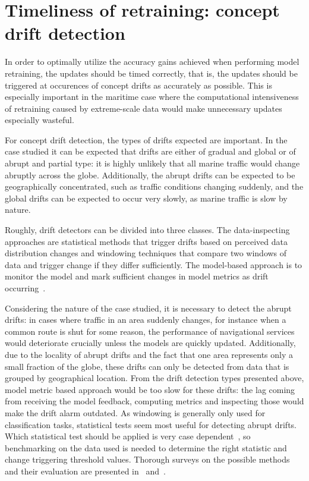 \section{Timeliness of retraining: concept drift detection}

In order to optimally utilize the accuracy gains achieved when performing model retraining, the updates should be timed correctly, that is, the updates should be triggered at occurences of concept drifts as accurately as possible. This is especially important in the maritime case where the computational intensiveness of retraining caused by extreme-scale data would make unnecessary updates especially wasteful.

For concept drift detection, the types of drifts expected are important. In the case studied it can be expected that drifts are either of gradual and global or of abrupt and partial type: it is highly unlikely that all marine traffic would change abruptly across the globe. Additionally, the abrupt drifts can be expected to be geographically concentrated, such as traffic conditions changing suddenly, and the global drifts can be expected to occur very slowly, as marine traffic is slow by nature.

Roughly, drift detectors can be divided into three classes. The data-inspecting approaches are statistical methods that trigger drifts based on perceived data distribution changes and windowing techniques that compare two windows of data and trigger change if they differ sufficiently. The model-based approach is to monitor the model and mark sufficient changes in model metrics as drift occurring~\cite{faithfullUnsupervisedChangeDetection2018}.

Considering the nature of the case studied, it is necessary to detect the abrupt drifts: in cases where traffic in an area suddenly changes, for instance when a common route is shut for some reason, the performance of navigational services would deteriorate crucially unless the models are quickly updated. Additionally, due to the locality of abrupt drifts and the fact that one area represents only a small fraction of the globe, these drifts can only be detected from data that is grouped by geographical location. From the drift detection types presented above, model metric based approach would be too slow for these drifts: the lag coming from receiving the model feedback, computing metrics and inspecting those would make the drift alarm outdated. As windowing is generally only used for classification tasks, statistical tests seem most useful for detecting abrupt drifts. Which statistical test should be applied is very case dependent~\cite{faithfullUnsupervisedChangeDetection2018}, so benchmarking on the data used is needed to determine the right statistic and change triggering threshold values. Thorough surveys on the possible methods and their evaluation are presented in~\cite{conceptdriftsurvey} and~\cite{faithfullUnsupervisedChangeDetection2018}.

